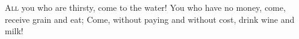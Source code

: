 
\lettrine{A}{ll} you who are thirsty,
   come to the water!
You who have no money,
   come, receive grain and eat;
Come, without paying and without cost,
   drink wine and milk!